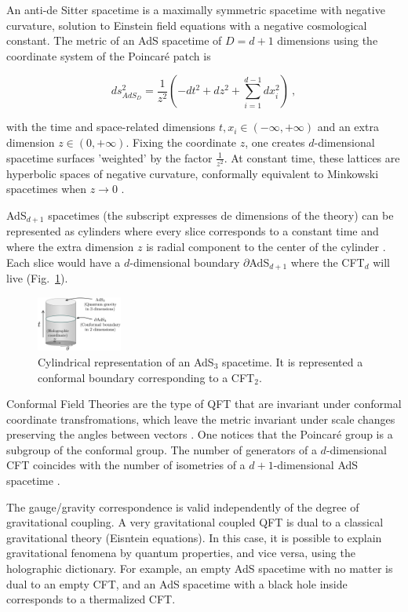 \documentclass[twocolumn]{revtex4}
\providecommand{\eq}[2]{
    \begin{equation}
        #2
    \label{eq:#1}
    \end{equation}
}
\begin{document}
An anti-de Sitter spacetime is a maximally symmetric spacetime with negative curvature, solution to Einstein field equations with a negative cosmological constant. The metric of an AdS spacetime of $D=d+1$ dimensions using the coordinate system of the Poincaré patch is
\eq{AdS_PP-metric}{
    ds_{AdS_D}^2 = \frac{1}{z^2} \left( -dt^2 + dz^2 + \sum_{i=1}^{d-1} dx_i^2 \right) \ ,
}
\cite{kaplan_lectures_nodate} with the time and space-related dimensions $t , x_i \in (-\infty,+\infty)$ and an extra dimension $z \in (0,+\infty)$. Fixing the coordinate $z$, one creates $d$-dimensional spacetime surfaces 'weighted' by the factor $\frac{1}{z^2}$. At constant time, these lattices are hyperbolic spaces of negative curvature, conformally equivalent to Minkowski spacetimes when $z \to 0$ \cite{}.

AdS$_{d+1}$ spacetimes (the subscript expresses de dimensions of the theory) can be represented as cylinders where every slice corresponds to a constant time and where the extra dimension $z$ is radial component to the center of the cylinder \cite{}. Each slice would have a $d$-dimensional boundary $\partial$AdS$_{d+1}$ where the CFT$_d$ will live (Fig.~\ref{fig:AdS}).

\begin{figure}
    \centering
    \includegraphics[width=0.25\textwidth]{../Imatges/AdS_Cylindric.png}
\caption{Cylindrical representation of an AdS$_3$ spacetime. It is represented a conformal boundary corresponding to a CFT$_2$.}
\label{fig:AdS}
\end{figure}

Conformal Field Theories are the type of QFT that are invariant under conformal coordinate transfromations, which leave the metric invariant under scale changes preserving the angles between vectors \cite{ginsparg_applied_1988}. One notices that the Poincaré group is a subgroup of the conformal group. The number of generators of a $d$-dimensional CFT coincides with the number of isometries of a $d+1$-dimensional AdS spacetime \cite{}.

The gauge/gravity correspondence is valid independently of the degree of gravitational coupling. A very gravitational coupled QFT is dual to a classical gravitational theory (Eisntein equations). In this case, it is possible to explain gravitational fenomena by quantum properties, and vice versa, using the holographic dictionary. For example, an empty AdS spacetime with no matter is dual to an empty CFT, and an AdS spacetime with a black hole inside corresponds to a thermalized CFT.
\end{document}
